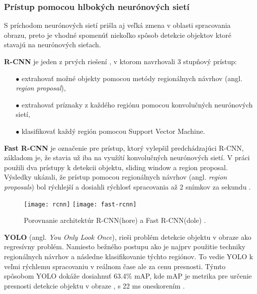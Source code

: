 \subsubsection{Prístup pomocou hlbokých neurónových sietí}
S príchodom neurónových sietí prišla aj veľká zmena v oblasti spracovania obrazu, preto je vhodné spomenúť niekoľko spôsob
    detekcie objektov ktoré stavajú na neurónových sieťach.

\textbf{R-CNN} je jeden z prvých riešení \cite{prop:rcnn}, v ktorom navrhovali 3 stupňový prístup:
\begin{enumerate}
	\item[$\bullet$] extrahovať možné objekty pomocou metódy regionálnych návrhov (angl. \textit{region proposal}),
    \item[$\bullet$] extrahovať príznaky z každého regiónu pomocou konvolučných neurónových sietí,
    \item[$\bullet$] klasifikovať každý región pomocou Support Vector Machine.
\end{enumerate}

\textbf{Fast R-CNN} je označenie pre prístup, ktorý vylepšil predchádzajúci R-CNN, základom je, že stavia už iba na využítí konvolučných neurónových sietí.
V práci použili dva prístupy k detekcii objektu, sliding window a region proposal.
Výsledky ukázali, že prístup pomocou regionálnych návrhov (angl. \textit{region proposals}) bol rýchlejší a dosiahli rýchlosť spracovania až 2 snímkov za sekundu \cite{prop:fast-rcnn}.
\begin{figure}[H]
    \centering
    \texttt{[image: rcnn]}
    \qquad
    \texttt{[image: fast-rcnn]}
    \caption{Porovnanie architektúr R-CNN(hore) a Fast R-CNN(dole) \cite{odkaz:ObjectDetectionOverview}.}
    \label{pic:FastRCNN}
\end{figure}

\textbf{YOLO} (angl. \textit{You Only Look Once}), rieši problém detekcie objektu v obraze ako regresívny problém.
Namiesto bežného postupu ako je najprv použitie techniky regionálnych návrhov a následne klasifikovanie týchto regiónov.
To vedie YOLO k veľmi rýchlemu spracovaniu v reálnom čase ale za cenu presnosti.
Týmto spôsobom YOLO dokáže dosiahnuť 63.4\% mAP, kde mAP je metrika pre určenie presnosti detekcie objektu v obraze \cite{prop:metrics}, s 22 ms oneskorením \cite{prop:Redmon2016YouOL}.

